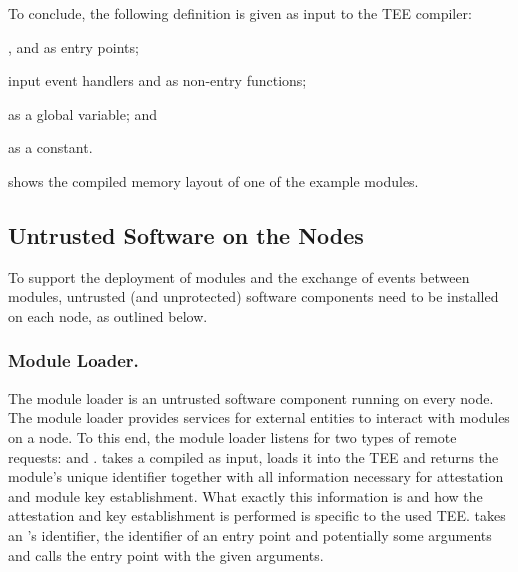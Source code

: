 To conclude, the following \protmod{} definition is given as input to the
\ac{TEE} compiler:
%
\begin{paraenum}
%
  \item \setkey, \attest{} and \handleinput{} as entry points;
%
  \item input event handlers and \handleoutput{} as non-entry functions;
%
  \item \conntab{} as a global variable; and
%
  \item \cbtab{} as a constant.
%
\end{paraenum}
%
 shows the compiled memory layout of one of the
example modules.


\subsection{Untrusted Software on the Nodes}
%
\label{concept:untrusted-sw}
%
To support the deployment of modules and the exchange of events between modules,
untrusted (and unprotected) software components need to be installed on each
node, as outlined below.

\subsubsection{Module Loader.} \label{concept:module-loader}
%
The module loader is an untrusted software component running on every node.
The module loader provides services for external entities to interact with
modules on a node.  To this end, the module loader listens for two types of
remote requests: \loadmodule{} and \callentry.  \loadmodule{} takes a
compiled \protmod{} as input, loads it into the \ac{TEE} and returns the
module's unique identifier together with all information necessary for
attestation and module key establishment.  What exactly this information is
and how the attestation and key establishment is performed is specific to
the used \ac{TEE}.  \callentry{} takes an \protmod's identifier, the
identifier of an entry point and potentially some arguments and calls the
entry point with the given arguments.

